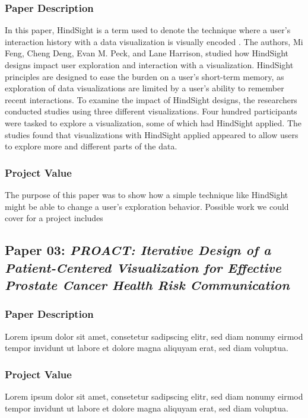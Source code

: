 \documentclass[journal]{vgtc}                %
\begin{document}
        \subsubsection{Paper Description}
        In this paper, HindSight is a term used to denote the technique where a user's interaction history with a data visualization is visually encoded \cite[p.~1]{HindSight:2016}. The authors, Mi Feng, Cheng Deng, Evan M. Peck, and Lane Harrison, studied how HindSight designs impact user exploration and interaction with a visualization. HindSight principles are designed to ease the burden on a user's short-term memory, as exploration of data visualizations are limited by a user's ability to remember recent interactions.
        To examine the impact of HindSight designs, the researchers conducted studies using three different visualizations. Four hundred participants were tasked to explore a visualization, some of which had HindSight applied. The studies found that visualizations with HindSight applied appeared to allow users to explore more and different parts of the data.

        \subsubsection{Project Value}
        The purpose of this paper was to show how a simple technique like HindSight might be able to change a user's exploration behavior. Possible work we could cover for a project includes

    \subsection{Paper 03: \textit{PROACT: Iterative Design of a Patient-Centered Visualization for Effective Prostate Cancer Health Risk Communication} \cite{PROACT:2016}}
        \subsubsection{Paper Description}
        Lorem ipsum dolor sit amet, consetetur sadipscing elitr, sed diam nonumy eirmod tempor invidunt ut labore et dolore magna aliquyam erat, sed diam voluptua.
        \subsubsection{Project Value}
        Lorem ipsum dolor sit amet, consetetur sadipscing elitr, sed diam nonumy eirmod tempor invidunt ut labore et dolore magna aliquyam erat, sed diam voluptua.
\end{document}
